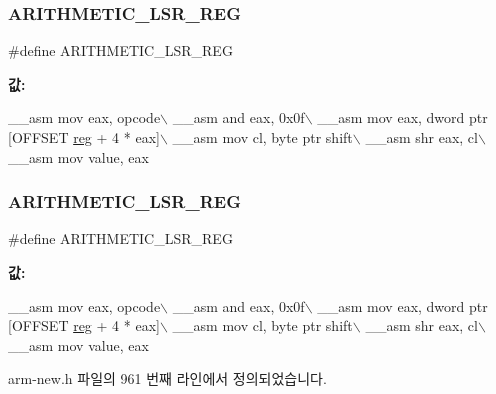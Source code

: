 \subsubsection{\texorpdfstring{A\+R\+I\+T\+H\+M\+E\+T\+I\+C\+\_\+\+L\+S\+R\+\_\+\+R\+EG}{ARITHMETIC\_LSR\_REG}\hspace{0.1cm}{\footnotesize\ttfamily [1/2]}}
{\footnotesize\ttfamily \#define A\+R\+I\+T\+H\+M\+E\+T\+I\+C\+\_\+\+L\+S\+R\+\_\+\+R\+EG}

{\bfseries 값\+:}
\begin{DoxyCode}
\_\_asm mov eax, opcode\(\backslash\)
        \_\_asm and eax, 0x0f\(\backslash\)
        \_\_asm mov eax, dword ptr [OFFSET \mbox{\hyperlink{_g_b_a_8h_ae29faba89509024ffd1a292badcedf2d}{reg}} + 4 * eax]\(\backslash\)
        \_\_asm mov cl, byte ptr shift\(\backslash\)
        \_\_asm shr eax, cl\(\backslash\)
        \_\_asm mov value, eax
\end{DoxyCode}
\mbox{\label{arm-new_8h_a8be5e0a331d3bc7956ff3310ffe86b71}} 
\subsubsection{\texorpdfstring{A\+R\+I\+T\+H\+M\+E\+T\+I\+C\+\_\+\+L\+S\+R\+\_\+\+R\+EG}{ARITHMETIC\_LSR\_REG}\hspace{0.1cm}{\footnotesize\ttfamily [2/2]}}
{\footnotesize\ttfamily \#define A\+R\+I\+T\+H\+M\+E\+T\+I\+C\+\_\+\+L\+S\+R\+\_\+\+R\+EG}

{\bfseries 값\+:}
\begin{DoxyCode}
\_\_asm mov eax, opcode\(\backslash\)
        \_\_asm and eax, 0x0f\(\backslash\)
        \_\_asm mov eax, dword ptr [OFFSET \mbox{\hyperlink{_g_b_a_8h_ae29faba89509024ffd1a292badcedf2d}{reg}} + 4 * eax]\(\backslash\)
        \_\_asm mov cl, byte ptr shift\(\backslash\)
        \_\_asm shr eax, cl\(\backslash\)
        \_\_asm mov value, eax
\end{DoxyCode}


arm-\/new.\+h 파일의 961 번째 라인에서 정의되었습니다.

\mbox{\label{_g_b_a_8cpp_ab11bb3d4159b15cfca8a3ac5421421f4}} 
